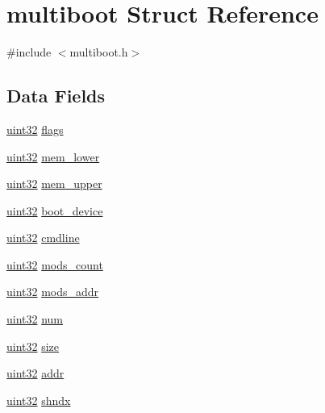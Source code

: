 \hypertarget{structmultiboot}{
\section{multiboot Struct Reference}
\label{structmultiboot}
}


{\ttfamily \#include $<$multiboot.h$>$}

\subsection*{Data Fields}
\begin{DoxyCompactItemize}
\item 
\hyperlink{int__types_8h_a1134b580f8da4de94ca6b1de4d37975e}{uint32} \hyperlink{structmultiboot_abed318746af32b1d0f5f2a50cbffb8ca}{flags}
\item 
\hyperlink{int__types_8h_a1134b580f8da4de94ca6b1de4d37975e}{uint32} \hyperlink{structmultiboot_a89507e64378274e21a65bccbf9b1555c}{mem\_\-lower}
\item 
\hyperlink{int__types_8h_a1134b580f8da4de94ca6b1de4d37975e}{uint32} \hyperlink{structmultiboot_a85ca5ccd7531e8154578376669e9041e}{mem\_\-upper}
\item 
\hyperlink{int__types_8h_a1134b580f8da4de94ca6b1de4d37975e}{uint32} \hyperlink{structmultiboot_a834a8b0e2158664622992058f9ef49bd}{boot\_\-device}
\item 
\hyperlink{int__types_8h_a1134b580f8da4de94ca6b1de4d37975e}{uint32} \hyperlink{structmultiboot_a03fba8bf57c8be9cada9047fdafdce8a}{cmdline}
\item 
\hyperlink{int__types_8h_a1134b580f8da4de94ca6b1de4d37975e}{uint32} \hyperlink{structmultiboot_abc3e364195feeaf327801564a4e49bd6}{mods\_\-count}
\item 
\hyperlink{int__types_8h_a1134b580f8da4de94ca6b1de4d37975e}{uint32} \hyperlink{structmultiboot_ab498e400b86badc8cd9268e8b911341f}{mods\_\-addr}
\item 
\hyperlink{int__types_8h_a1134b580f8da4de94ca6b1de4d37975e}{uint32} \hyperlink{structmultiboot_ac5a780075eee3041b3c915d32f37d51a}{num}
\item 
\hyperlink{int__types_8h_a1134b580f8da4de94ca6b1de4d37975e}{uint32} \hyperlink{structmultiboot_ae6840a28f883874187013f4d7710f880}{size}
\item 
\hyperlink{int__types_8h_a1134b580f8da4de94ca6b1de4d37975e}{uint32} \hyperlink{structmultiboot_a431baceb33f4cc5b3d503d8b8a6f007e}{addr}
\item 
\hyperlink{int__types_8h_a1134b580f8da4de94ca6b1de4d37975e}{uint32} \hyperlink{structmultiboot_abb0198fa44cac2b02164410e8cb26621}{shndx}

\end{DoxyCompactItemize}
